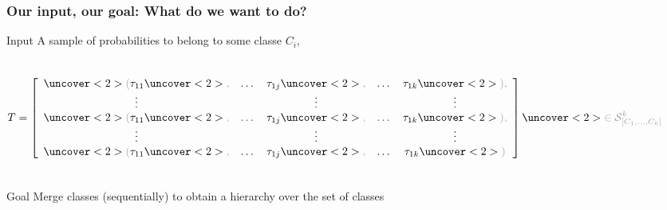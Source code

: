 \begin{frame}[t]
\frametitle{Our input, our goal: What do we want to do?}

\begin{block}{Input}
A sample of probabilities to belong to some classe $C_i$, 
\begin{columns}
\[ T = \left[ \begin{array}{ccccc}
\idea{(}\tau_{11}\idea{,} & \dots & \tau_{1j}\idea{,} & \dots & \tau_{1k}\idea{),} \\
\vdots      & &    \vdots                     & &    \vdots                     \\
\idea{(}\tau_{11}\idea{,} & \dots & \tau_{1j}\idea{,} & \dots & \tau_{1k}\idea{),} \\
\vdots      & &      \vdots                   & &       \vdots                  \\
\idea{(}\tau_{11}\idea{,} & \dots & \tau_{1j}\idea{,} & \dots & \tau_{1k}\idea{)}
\end{array} \right] 
\idea{ \in \mathcal{S}_{[C_1,\dots,C_k]}^k } \]

\end{columns}
\end{block}
\begin{alertblock}{Goal}
\alert{Merge} classes (sequentially) to obtain a hierarchy over the set of classes %
\end{alertblock}

\end{frame}